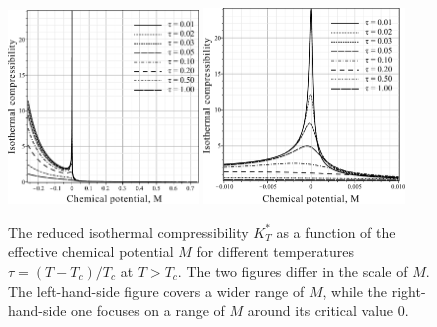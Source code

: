 \begin{figure}[h!]
	\centering \includegraphics[width=0.45\textwidth]{f2b.pdf}
	\includegraphics[width=0.475\textwidth]{f2c.pdf}
	\vskip-3mm\caption{The reduced isothermal compressibility $K^*_T$ as a function of the effective chemical potential $M$ for different temperatures $\tau = (T - T_c)/T_c$ at $T > T_c$. The two figures differ in the scale of $M$. The left-hand-side figure covers a wider range of $M$, while the right-hand-side one focuses on a range of $M$ around its critical value $0$.
	}\label{fig2b}
\end{figure}


